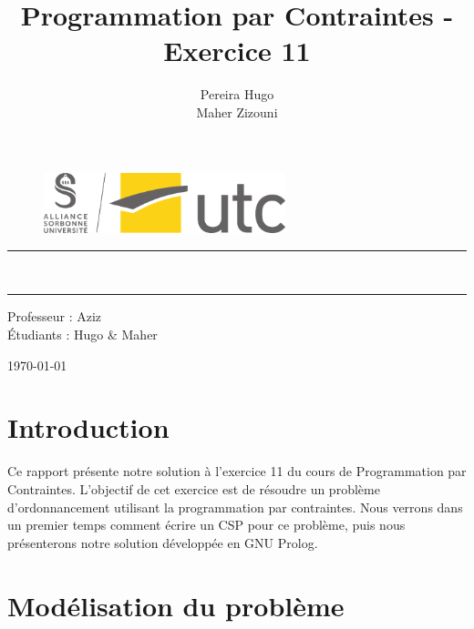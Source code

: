 \documentclass{latexPackage/utc-report/utc-report}
\title{Programmation par Contraintes - Exercice 11}
\author{{\sc Pereira} Hugo \\ {\sc Maher} Zizouni}
\begin{document}
\thispagestyle{empty}
\setcounter{page}{0}

\begin{figure}[H]
\centering
\includegraphics[width=7cm]{latexPackage/utc-report/utc-graphics/logos/UTC/logo_UTC.pdf}
\end{figure}

\vspace{2cm}

\begin{center}

{\color{jauneUTC}\rule{\linewidth}{0.8mm}}
\vspace*{0mm}

\Huge{\textbf{\theUV \\ \thetitle}}
{\color{jauneUTC}\rule{\linewidth}{0.8mm}}

\vspace{2cm}

\Large{
    Professeur :  Aziz \\
    Étudiants :  Hugo \&  Maher
} \\

\vspace{2cm}

\today

\end{center}

\pagebreak

\tableofcontents{}

\pagebreak

\section{Introduction}

Ce rapport présente notre solution à l'exercice 11 du cours de Programmation par Contraintes. L'objectif de cet exercice est de résoudre un problème d'ordonnancement utilisant la programmation par contraintes. Nous verrons dans un premier temps comment écrire un CSP pour ce problème, puis nous présenterons notre solution développée en GNU Prolog.

\section{Modélisation du problème}
\end{document}
